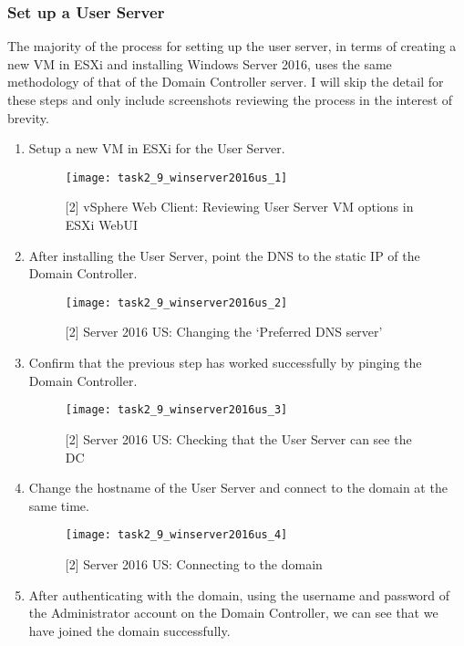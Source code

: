 \subsubsection{Set up a User Server}
The majority of the process for setting up the user server, in terms of creating a new VM in ESXi and installing Windows Server 2016, uses the same methodology of that of the Domain Controller server. I will skip the detail for these steps and only include screenshots reviewing the process in the interest of brevity.
\begin{enumerate}[series=task2methodology4]
  \item Setup a new VM in ESXi for the User Server.
    \begin{figure}[H]
      \centering
      \captionsetup{skip=2pt}
      \texttt{[image: task2\_9\_winserver2016us\_1]}
      \caption{[2] vSphere Web Client: Reviewing User Server VM options in ESXi WebUI}
      \label{fig:task2:vspherec_us1}
    \end{figure}
  \item After installing the User Server, point the DNS to the static IP of the Domain Controller.
    \begin{figure}[H]
      \centering
      \captionsetup{skip=2pt}
      \texttt{[image: task2\_9\_winserver2016us\_2]}
      \caption{[2] Server 2016 US: Changing the `Preferred DNS server'}
      \label{fig:task2:vspherec_us2}
    \end{figure}
  \item Confirm that the previous step has worked successfully by pinging the Domain Controller.
    \begin{figure}[H]
      \centering
      \captionsetup{skip=2pt}
      \texttt{[image: task2\_9\_winserver2016us\_3]}
      \caption{[2] Server 2016 US: Checking that the User Server can see the DC}
      \label{fig:task2:vspherec_us3}
    \end{figure}
  \item Change the hostname of the User Server and connect to the domain at the same time.
    \begin{figure}[H]
      \centering
      \captionsetup{skip=2pt}
      \texttt{[image: task2\_9\_winserver2016us\_4]}
      \caption{[2] Server 2016 US: Connecting to the domain}
      \label{fig:task2:vspherec_us4}
    \end{figure}
  \item After authenticating with the domain, using the username and password of the Administrator account on the Domain Controller, we can see that we have joined the domain successfully.

\end{enumerate}

